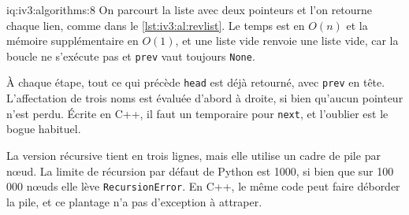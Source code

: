 \begin{solution}{iq:iv3:algorithms:8}
On parcourt la liste avec deux pointeurs et l'on retourne chaque lien, comme dans le \cref{lst:iv3:al:revlist}. Le temps est en $O(n)$ et la mémoire supplémentaire en $O(1)$, et une liste vide renvoie une liste vide, car la boucle ne s'exécute pas et \texttt{prev} vaut toujours \texttt{None}.
\enlargethispage{-3\baselineskip}%
\label{lst:iv3:al:revlist}

À chaque étape, tout ce qui précède \texttt{head} est déjà retourné, avec \texttt{prev} en tête. L'affectation de trois noms est évaluée d'abord à droite, si bien qu'aucun pointeur n'est perdu. Écrite en C++, il faut un temporaire pour \texttt{next}, et l'oublier est le bogue habituel.

La version récursive tient en trois lignes, mais elle utilise un cadre de pile par nœud. La limite de récursion par défaut de Python est 1000, si bien que sur 100\,000 nœuds elle lève \texttt{RecursionError}. En C++, le même code peut faire déborder la pile, et ce plantage n'a pas d'exception à attraper.

\end{solution}

